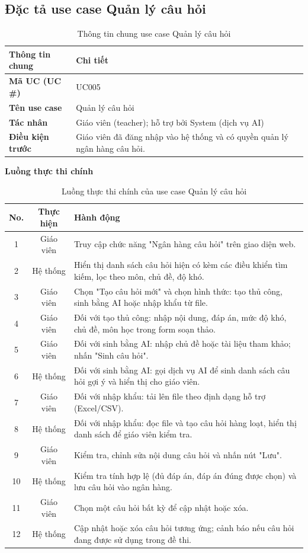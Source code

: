 ﻿\documentclass[../DoAn.tex]{subfiles}
\begin{document}
\subsection{Đặc tả use case Quản lý câu hỏi}
\label{subsection:2.3.2}
\begin{table}[H]
\centering
\begin{tabular}{|p{4cm}|p{10cm}|}
\hline
\textbf{Thông tin chung} & \textbf{Chi tiết} \\ \hline
\textbf{Mã UC (UC \#)} & UC005 \\ \hline
\textbf{Tên use case} & Quản lý câu hỏi \\ \hline
\textbf{Tác nhân} & Giáo viên (teacher); hỗ trợ bởi System (dịch vụ AI) \\ \hline
\textbf{Điều kiện trước} & Giáo viên đã đăng nhập vào hệ thống và có quyền quản lý ngân hàng câu hỏi. \\ \hline
\end{tabular}
\caption{Thông tin chung use case Quản lý câu hỏi}
\label{table:2.3.2_info}
\end{table}
\noindent\textbf{Luồng thực thi chính}
\begin{table}[H]
\centering
\begin{tabular}{|c|c|p{9cm}|}
\hline
\textbf{No.} & \textbf{Thực hiện} & \textbf{Hành động} \\ \hline
1 & Giáo viên & Truy cập chức năng "Ngân hàng câu hỏi" trên giao diện web. \\ \hline
2 & Hệ thống & Hiển thị danh sách câu hỏi hiện có kèm các điều khiển tìm kiếm, lọc theo môn, chủ đề, độ khó. \\ \hline
3 & Giáo viên & Chọn "Tạo câu hỏi mới" và chọn hình thức: tạo thủ công, sinh bằng AI hoặc nhập khẩu từ file. \\ \hline
4 & Giáo viên & Đối với tạo thủ công: nhập nội dung, đáp án, mức độ khó, chủ đề, môn học trong form soạn thảo. \\ \hline
5 & Giáo viên & Đối với sinh bằng AI: nhập chủ đề hoặc tài liệu tham khảo; nhấn "Sinh câu hỏi". \\ \hline
6 & Hệ thống & Đối với sinh bằng AI: gọi dịch vụ AI để sinh danh sách câu hỏi gợi ý và hiển thị cho giáo viên. \\ \hline
7 & Giáo viên & Đối với nhập khẩu: tải lên file theo định dạng hỗ trợ (Excel/CSV). \\ \hline
8 & Hệ thống & Đối với nhập khẩu: đọc file và tạo câu hỏi hàng loạt, hiển thị danh sách để giáo viên kiểm tra. \\ \hline
9 & Giáo viên & Kiểm tra, chỉnh sửa nội dung câu hỏi và nhấn nút "Lưu". \\ \hline
10 & Hệ thống & Kiểm tra tính hợp lệ (đủ đáp án, đáp án đúng được chọn) và lưu câu hỏi vào ngân hàng. \\ \hline
11 & Giáo viên & Chọn một câu hỏi bất kỳ để cập nhật hoặc xóa. \\ \hline
12 & Hệ thống & Cập nhật hoặc xóa câu hỏi tương ứng; cảnh báo nếu câu hỏi đang được sử dụng trong đề thi. \\ \hline
\end{tabular}
\caption{Luồng thực thi chính của use case Quản lý câu hỏi}
\label{table:2.3.2_main}
\end{table}
\end{document}
